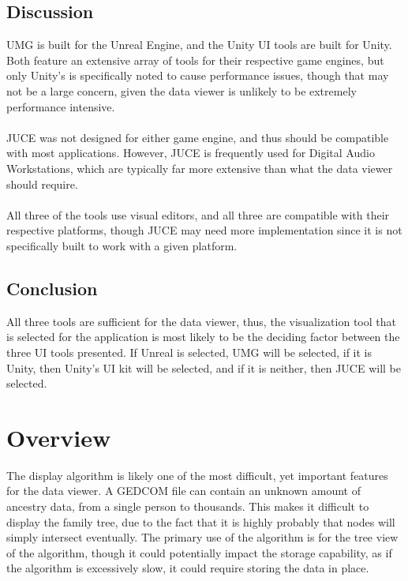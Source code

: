 \documentclass[onecolumn, draftclsnofoot,10pt, compsoc]{IEEEtran}
\begin{document}
\subsection{Discussion}
UMG is built for the Unreal Engine, and the Unity UI tools are built for Unity. Both feature an extensive array of tools for their respective game engines, but only Unity's is specifically noted to cause performance issues, though that may not be a large concern, given the data viewer is unlikely to be extremely performance intensive. 
\\
\\
JUCE was not designed for either game engine, and thus should be compatible with most applications. However, JUCE is frequently used for Digital Audio Workstations, which are typically far more extensive than what the data viewer should require. 
\\
\\
All three of the tools use visual editors, and all three are compatible with their respective platforms, though JUCE may need more implementation since it is not specifically built to work with a given platform.

\subsection{Conclusion}
All three tools are sufficient for the data viewer, thus, the visualization tool that is selected for the application is most likely to be the deciding factor between the three UI tools presented. If Unreal is selected, UMG will be selected, if it is Unity, then Unity's UI kit will be selected, and if it is neither, then JUCE will be selected.

\section{Overview}
The display algorithm is likely one of the most difficult, yet important features for the data viewer. A GEDCOM file can contain an unknown amount of ancestry data, from a single person to thousands. This makes it difficult to display the family tree, due to the fact that it is highly probably that nodes will simply intersect eventually. The primary use of the algorithm is for the tree view of the algorithm, though it could potentially impact the storage capability, as if the algorithm is excessively slow, it could require storing the data in place.
\end{document}
